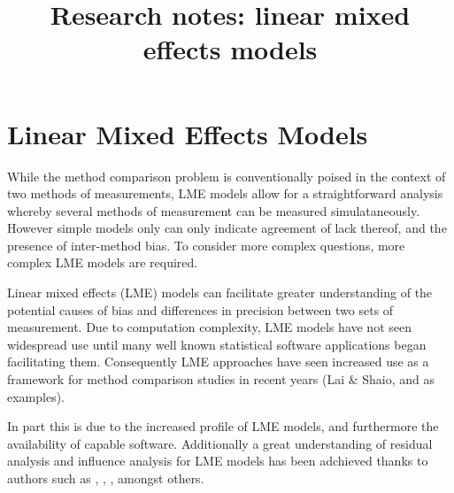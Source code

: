 \documentclass[12pt, a4paper]{report}
\title{Research notes: linear mixed effects models}
\author{ } \date{ }
\theoremstyle{plain}
\theoremstyle{definition}
\theoremstyle{remark}
\begin{document}


%
%
%
%  

\chapter{Linear Mixed Effects Models}
While the method comparison problem is conventionally poised in the context of two methods of measurements, LME models allow for a straightforward analysis whereby several methods of measurement can be measured simulataneously. However simple models only can only indicate agreement of lack thereof, and the presence of inter-method bias. To consider more complex questions, more complex LME models are required.

Linear mixed effects (LME) models can facilitate greater understanding of the potential causes of bias and differences in precision between two sets of measurement. Due to computation complexity, LME models have not seen widespread use until many well known statistical software applications began facilitating them. Consequently LME approaches have seen increased use as a framework for method comparison studies in recent years (Lai $\&$ Shaio, \citet{BXC2004,BXC2008} and \citet{ARoy2009} as examples).


In part this is due to the increased profile of LME models, and furthermore the availability of capable software. Additionally a great understanding of residual analysis and influence analysis for LME models has been adchieved thanks to authors such as \citet{schabenberger}, \citet{Christensen}, \citet{cook86} \citet{west}, amongst others.
\end{document}
